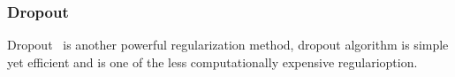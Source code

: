 \subsubsection{Dropout}

Dropout~\cite{JMLR:v15:srivastava14a} is another powerful regularization method, dropout algorithm is simple yet efficient and is one of the less computationally expensive regularioption. 